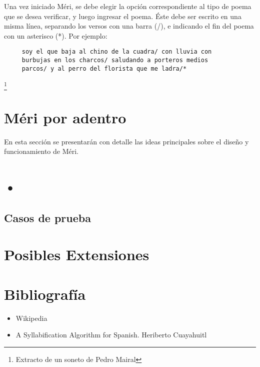 \documentclass[12pt, a4paper]{article}
\begin{document}
Una vez iniciado Méri, se debe elegir la opción correspondiente al tipo de poema que se desea verificar, y luego ingresar el poema. Éste debe ser escrito en una misma línea, separando los versos con una barra (/), e indicando el fin del poema con un asterisco (*). Por ejemplo:
\begin{verbatim}
     soy el que baja al chino de la cuadra/ con lluvia con 
     burbujas en los charcos/ saludando a porteros medios 
     parcos/ y al perro del florista que me ladra/*
\end{verbatim}\footnote{Extracto de un soneto de Pedro Mairal}
\section*{Méri por adentro}
En esta sección se presentarán con detalle las ideas principales sobre el diseño y funcionamiento de Méri.

\section*{•}

\subsection*{Casos de prueba}

\section*{Posibles Extensiones} 

\section*{Bibliografía}
 \begin{itemize}
 	\item Wikipedia
 	\item A Syllabification Algorithm for Spanish. Heriberto Cuayahuitl
 \end{itemize}
\end{document}
